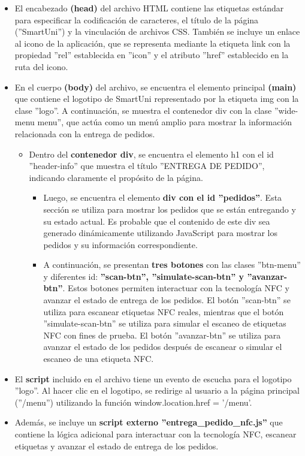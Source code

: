 \documentclass[12pt]{report}
\begin{document}
\begin{itemize}
    \item El encabezado\textbf{ (head)} del archivo HTML contiene las etiquetas estándar para especificar la codificación de caracteres, el título de la página (''SmartUni'') y la vinculación de archivos CSS. También se incluye un enlace al icono de la aplicación, que se representa mediante la etiqueta link con la propiedad ''rel'' establecida en ''icon'' y el atributo ''href'' establecido en la ruta del icono.

    \item En el cuerpo \textbf{(body) }del archivo, se encuentra el elemento principal\textbf{ (main)} que contiene el logotipo de SmartUni representado por la etiqueta img con la clase ''logo''. A continuación, se muestra el contenedor div con la clase ''wide-menu menu'', que actúa como un menú amplio para mostrar la información relacionada con la entrega de pedidos.

    \begin{itemize}
        \item Dentro del \textbf{contenedor div}, se encuentra el elemento h1 con el id ''header-info'' que muestra el título ''ENTREGA DE PEDIDO'', indicando claramente el propósito de la página.
        
        \begin{itemize}
            \item Luego, se encuentra el elemento \textbf{div con el id ''pedidos''}. Esta sección se utiliza para mostrar los pedidos que se están entregando y su estado actual. Es probable que el contenido de este div sea generado dinámicamente utilizando JavaScript para mostrar los pedidos y su información correspondiente.
            
            \item A continuación, se presentan \textbf{tres botones }con las clases ''btn-menu'' y diferentes id: \textbf{''scan-btn'', ''simulate-scan-btn'' y ''avanzar-btn''}. Estos botones permiten interactuar con la tecnología NFC y avanzar el estado de entrega de los pedidos. El botón ''scan-btn'' se utiliza para escanear etiquetas NFC reales, mientras que el botón ''simulate-scan-btn'' se utiliza para simular el escaneo de etiquetas NFC con fines de prueba. El botón ''avanzar-btn'' se utiliza para avanzar el estado de los pedidos después de escanear o simular el escaneo de una etiqueta NFC.
        \end{itemize}
    \end{itemize}

    \item El \textbf{script}  incluido en el archivo tiene un evento de escucha para el logotipo ''logo''. Al hacer clic en el logotipo, se redirige al usuario a la página principal (''/menu'') utilizando la función window.location.href = '/menu'.

    \item Además, se incluye un \textbf{script externo ''entrega\_pedido\_nfc.js''} que contiene la lógica adicional para interactuar con la tecnología NFC, escanear etiquetas y avanzar el estado de entrega de los pedidos.
\end{itemize}
\end{document}
